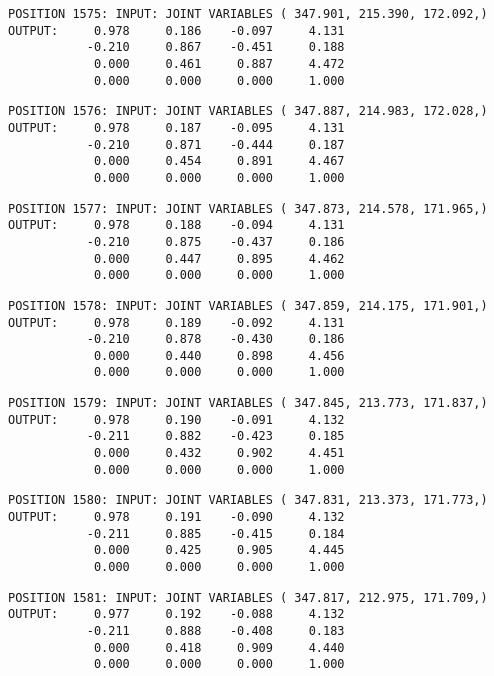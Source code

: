 \begin{verbatim}
POSITION 1575: INPUT: JOINT VARIABLES ( 347.901, 215.390, 172.092,)
OUTPUT:     0.978     0.186    -0.097     4.131
           -0.210     0.867    -0.451     0.188
            0.000     0.461     0.887     4.472
            0.000     0.000     0.000     1.000
\end{verbatim} \pagebreak[1]\begin{verbatim}
POSITION 1576: INPUT: JOINT VARIABLES ( 347.887, 214.983, 172.028,)
OUTPUT:     0.978     0.187    -0.095     4.131
           -0.210     0.871    -0.444     0.187
            0.000     0.454     0.891     4.467
            0.000     0.000     0.000     1.000
\end{verbatim} \pagebreak[1]\begin{verbatim}
POSITION 1577: INPUT: JOINT VARIABLES ( 347.873, 214.578, 171.965,)
OUTPUT:     0.978     0.188    -0.094     4.131
           -0.210     0.875    -0.437     0.186
            0.000     0.447     0.895     4.462
            0.000     0.000     0.000     1.000
\end{verbatim} \pagebreak[1]\begin{verbatim}
POSITION 1578: INPUT: JOINT VARIABLES ( 347.859, 214.175, 171.901,)
OUTPUT:     0.978     0.189    -0.092     4.131
           -0.210     0.878    -0.430     0.186
            0.000     0.440     0.898     4.456
            0.000     0.000     0.000     1.000
\end{verbatim} \pagebreak[1]\begin{verbatim}
POSITION 1579: INPUT: JOINT VARIABLES ( 347.845, 213.773, 171.837,)
OUTPUT:     0.978     0.190    -0.091     4.132
           -0.211     0.882    -0.423     0.185
            0.000     0.432     0.902     4.451
            0.000     0.000     0.000     1.000
\end{verbatim} \pagebreak[1]\begin{verbatim}
POSITION 1580: INPUT: JOINT VARIABLES ( 347.831, 213.373, 171.773,)
OUTPUT:     0.978     0.191    -0.090     4.132
           -0.211     0.885    -0.415     0.184
            0.000     0.425     0.905     4.445
            0.000     0.000     0.000     1.000
\end{verbatim} \pagebreak[1]\begin{verbatim}
POSITION 1581: INPUT: JOINT VARIABLES ( 347.817, 212.975, 171.709,)
OUTPUT:     0.977     0.192    -0.088     4.132
           -0.211     0.888    -0.408     0.183
            0.000     0.418     0.909     4.440
            0.000     0.000     0.000     1.000
\end{verbatim} \pagebreak[1]\begin{verbatim}

\end{verbatim}

